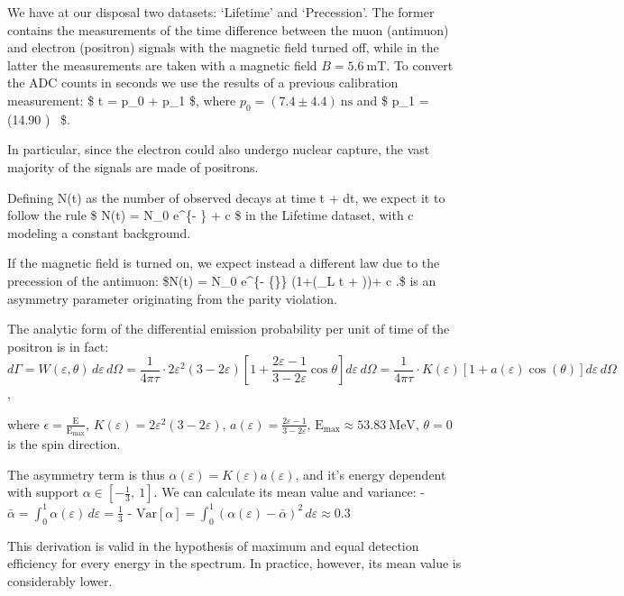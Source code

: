 \documentclass[
]{article}
\begin{document}
We have at our disposal two datasets: `Lifetime' and `Precession'. The
former contains the measurements of the time difference between the muon
(antimuon) and electron (positron) signals with the magnetic field
turned off, while in the latter the measurements are taken with a
magnetic field \(B=5.6\ \text{mT}\). To convert the ADC counts in
seconds we use the results of a previous calibration measurement: \$ t =
p\_0 +  \cdot p\_1 \$, where
\(p_0 = (7.4 \pm 4.4)\ \text{ns}\) and \$ p\_1 = (14.90
)~ \$.

In particular, since the electron could also undergo nuclear capture,
the vast majority of the signals are made of positrons.

Defining N(t) as the number of observed decays at time t + dt, we expect
it to follow the rule \$ N(t) = N\_0 e\^{}\{- \} + c \$ in
the Lifetime dataset, with c modeling a constant background.

If the magnetic field is turned on, we expect instead a different law
due to the precession of the antimuon: \$N(t) = N\_0 e\^{}\{-
\{\tau\}\} \cdot (1+\alpha \cos(\omega\_L t + \delta))+ c \(.\)\alpha\$
is an asymmetry parameter originating from the parity violation.

The analytic form of the differential emission probability per unit of
time of the positron is in fact: \[
d\Gamma = W(\varepsilon, \theta) \, d\varepsilon \, d\Omega = \frac{1}{4\pi \tau} \cdot 2\varepsilon^2 (3 - 2\varepsilon) \left[ 1 + \frac{2\varepsilon - 1}{3 - 2\varepsilon} \cos \theta \right] d\varepsilon \, d\Omega = \frac{1}{4\pi \tau} \cdot K(\varepsilon)[1+a(\varepsilon) \cos(\theta)] d\varepsilon \, d\Omega
\],

where \(\epsilon = \frac{\text{E}}{\text{E}_{\text{max}}}\),
\(K(\varepsilon) = 2\varepsilon^2(3-2\varepsilon)\),
\(a(\varepsilon) = \frac{2\varepsilon-1}{3-2\varepsilon}\),
\(\text{E}_{\text{max}} \approx 53.83\ \text{MeV}\), \(\theta=0\) is the
spin direction.

The asymmetry term is thus
\(\alpha(\varepsilon) = K(\varepsilon)a(\varepsilon)\), and it's energy
dependent with support \(\alpha\in \left[ -\frac 1 3,\ 1 \right]\). We
can calculate its mean value and variance: -
\(\bar{\alpha} = \int_0^1 \alpha(\varepsilon) \, d\varepsilon= \frac{1}{3}\)
-
\(\text{Var}[\alpha] = \int_0^1 (\alpha(\varepsilon)-\bar{\alpha})^2 \, d\varepsilon \approx 0.3\)

This derivation is valid in the hypothesis of maximum and equal
detection efficiency for every energy in the spectrum. In practice,
however, its mean value is considerably lower.
\end{document}

